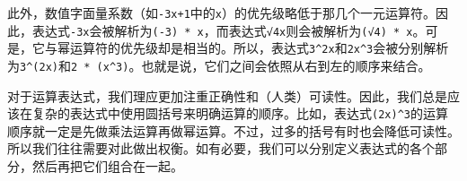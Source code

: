 此外，数值字面量系数（如\verb`-3x+1`中的\verb`x`）的优先级略低于那几个一元运算符。因此，表达式\verb`-3x`会被解析为\verb`(-3) * x`，而表达式\verb`√4x`则会被解析为\verb`(√4) * x`。可是，它与幂运算符的优先级却是相当的。所以，表达式\verb`3^2x`和\verb`2x^3`会被分别解析为\verb`3^(2x)`和\verb`2 * (x^3)`。也就是说，它们之间会依照从右到左的顺序来结合。

对于运算表达式，我们理应更加注重正确性和（人类）可读性。因此，我们总是应该在复杂的表达式中使用圆括号来明确运算的顺序。比如，表达式\verb`(2x)^3`的运算顺序就一定是先做乘法运算再做幂运算。不过，过多的括号有时也会降低可读性。所以我们往往需要对此做出权衡。如有必要，我们可以分别定义表达式的各个部分，然后再把它们组合在一起。
